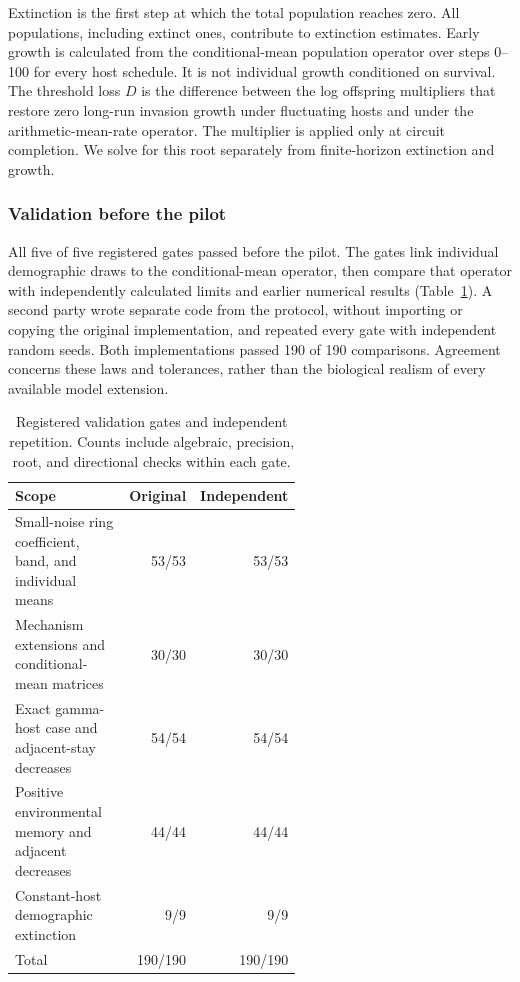 Extinction is the first step at which the total population reaches zero.
All populations, including extinct ones, contribute to extinction estimates.
Early growth is calculated from the conditional-mean population operator
over steps 0--100 for every host schedule. It is not individual growth
conditioned on survival. The threshold loss $D$ is the difference between
the log offspring multipliers that restore zero long-run invasion growth
under fluctuating hosts and under the arithmetic-mean-rate operator.
The multiplier is applied only at circuit completion. We solve for this
root separately from finite-horizon extinction and growth.

\subsubsection{Validation before the pilot}
\label{num-esm-validation}

All five of five registered gates passed before the pilot. The gates link
individual demographic draws to the conditional-mean operator, then compare
that operator with independently calculated limits and earlier numerical
results (Table~\ref{num-validation-table}). A second party wrote separate
code from the protocol, without importing or copying the original
implementation, and repeated every gate with independent random seeds.
Both implementations passed 190 of 190 comparisons. Agreement concerns
these laws and tolerances, rather than the biological realism of every
available model extension.

\begin{table}[htbp]
\centering
\caption{Registered validation gates and independent repetition. Counts include
algebraic, precision, root, and directional checks within each gate.}
\label{num-validation-table}
\begin{tabular}{p{0.57\linewidth}rr}
\toprule
Scope & Original & Independent \\
\midrule
Small-noise ring coefficient, band, and individual means & 53/53 & 53/53 \\
Mechanism extensions and conditional-mean matrices & 30/30 & 30/30 \\
Exact gamma-host case and adjacent-stay decreases & 54/54 & 54/54 \\
Positive environmental memory and adjacent decreases & 44/44 & 44/44 \\
Constant-host demographic extinction & 9/9 & 9/9 \\
\midrule
Total & 190/190 & 190/190 \\
\bottomrule
\end{tabular}
\end{table}

